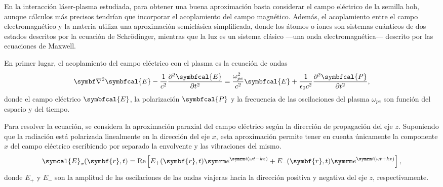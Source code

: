 En la interacción láser-plasma estudiada, para obtener una buena aproximación basta considerar el campo eléctrico de la semilla \acrshort{hoh}, aunque cálculos más precisos tendrían que incorporar el acoplamiento del campo magnético. Además, el acoplamiento entre el campo electromagnético y la materia utiliza una aproximación semiclásica simplificada, donde los átomos o iones son sistemas cuánticos de dos estados descritos por la ecuación de Schrödinger, mientras que la luz es un sistema clásico ---una onda electromagnética--- descrito por las ecuaciones de Maxwell.

En primer lugar, el acoplamiento del campo eléctrico con el plasma es la ecuación de ondas 
\begin{equation}
    \nab^2 {\symbfcal{E}} - \frac{1}{c^2}\frac{\partial^2 {\symbfcal{E}}}{\partial t^2} = 
    \frac{\omega_{pe}^2}{c^2}{\symbfcal{E}} + \frac{1}{\epsilon_0 c^2}\frac{\partial^2 {\symbfcal{P}}}{\partial t^2},
    \label{eq131}
\end{equation}
\noindent
donde el campo eléctrico ${\symbfcal{E}}$, la polarización ${\symbfcal{P}}$ y la frecuencia de las oscilaciones del plasma $\omega_{pe}$ son función del espacio y del tiempo.

Para resolver la ecuación, se considera la aproximación paraxial del campo eléctrico según la dirección de propagación del eje $z$. Suponiendo que la radiación está polarizada linealmente en la dirección del eje $x$, esta aproximación permite tener en cuenta únicamente la componente $x$ del campo eléctrico escribiendo por separado la envolvente y las vibraciones del mismo.
\begin{equation}
    \symcal{E}_x(\symbf{r},t) 
    =
    \RE\left[E_+(\symbf{r},t)\eu^{\iu(\omega t - kz)}+E_-(\symbf{r},t)\eu^{\iu(\omega t + kz)}\right],
    \label{eq231}
\end{equation}
\noindent
donde $E_+$ y $E_-$ son la amplitud de las oscilaciones de las ondas viajeras hacia la dirección positiva y negativa del eje $z$, respectivamente. 


